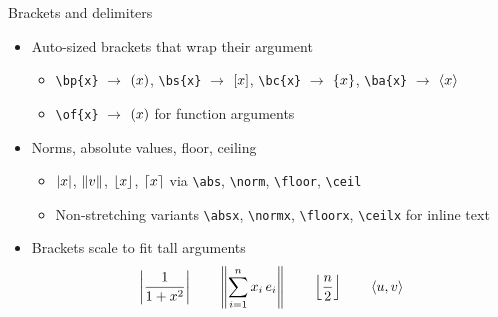 \documentclass[10pt,itemsep]{beamer}
\begin{document}
\begin{frame}[t]
    {Brackets and delimiters}
    \begin{itemize}
        \item Auto-sized brackets that wrap their argument
        \begin{itemize}
            \item \texttt{\textbackslash bp\{x\}} $\to$ $\left( x \right)$, \texttt{\textbackslash bs\{x\}} $\to$ $\left[ x \right]$, \texttt{\textbackslash bc\{x\}} $\to$ $\left\lbrace x \right\rbrace$, \texttt{\textbackslash ba\{x\}} $\to$ $\left< x \right>$
            \item \texttt{\textbackslash of\{x\}} $\to$ ${\left( x \right)}$ for function arguments
        \end{itemize}
        \item Norms, absolute values, floor, ceiling
        \begin{itemize}
            \item $\left\lvert x \right\rvert$, $\left\lVert v \right\rVert$, $\left\lfloor x \right\rfloor$, $\left\lceil x \right\rceil$ via \texttt{\textbackslash abs}, \texttt{\textbackslash norm}, \texttt{\textbackslash floor}, \texttt{\textbackslash ceil}
            \item Non-stretching variants \texttt{\textbackslash absx}, \texttt{\textbackslash normx}, \texttt{\textbackslash floorx}, \texttt{\textbackslash ceilx} for inline text
        \end{itemize}
        \item Brackets scale to fit tall arguments
        \begin{equation*}
            \left\lvert \frac{1}{1+x^{2}} \right\rvert \quad\quad \left\lVert \sum_{i=1}^{n} x_{i}\, e_{i} \right\rVert \quad\quad \left\lfloor \frac{n}{2} \right\rfloor \quad\quad \left< u, v \right>
        \end{equation*}
    \end{itemize}
\end{frame}
\end{document}
